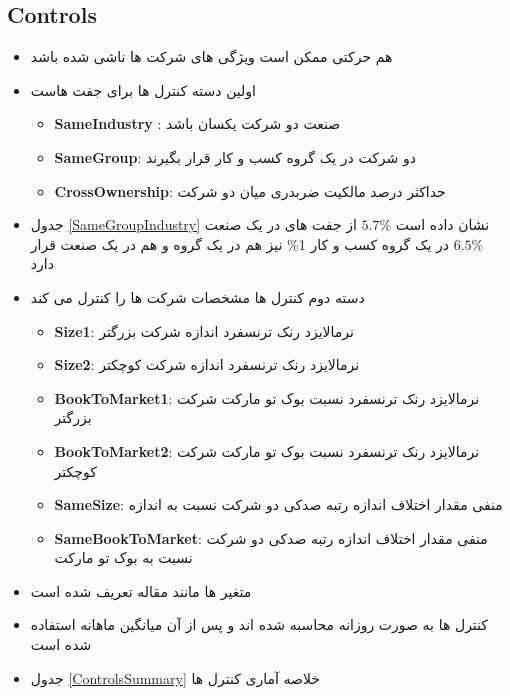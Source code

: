 \FloatBarrier


\subsection{Controls}

\begin{itemize}
	\item 
	هم حرکتی ممکن است ویژگی های شرکت ها ناشی شده باشد
	
	\item 
	اولین دسته کنترل ها برای جفت هاست
	\begin{itemize}
\item 
\textbf{SameIndustry} :
صنعت دو شرکت یکسان باشد
\item 
\textbf{SameGroup}:
دو شرکت در یک گروه کسب و کار قرار بگیرند
\item 
\textbf{CrossOwnership}:
حداکثر درصد مالکیت ضربدری میان دو شرکت
		
	\end{itemize}
	\item 
	جدول
	\ref{SameGroupIndustry}
	نشان داده است $5.7 \%$ از جفت های در یک صنعت
	$6.5 \%$ در یک گروه کسب و کار
	1\% نیز هم در یک گروه و هم در یک صنعت قرار دارد
	\item 
دسته دوم کنترل ها مشخصات شرکت ها را کنترل می کند
\begin{itemize}
	\item \textbf{Size1}:
	نرمالایزد رنک ترنسفرد اندازه شرکت بزرگتر
	
	
	\item \textbf{Size2}:
	نرمالایزد رنک ترنسفرد اندازه شرکت کوچکتر
	
	\item \textbf{BookToMarket1}:
	نرمالایزد رنک ترنسفرد نسبت بوک تو مارکت شرکت بزرگتر
	
	\item \textbf{BookToMarket2}:
		نرمالایزد رنک ترنسفرد نسبت بوک تو مارکت شرکت کوچکتر
	\item \textbf{SameSize}:
	منفی مقدار اختلاف اندازه رتبه صدکی دو شرکت نسبت به اندازه
	\item  \textbf{SameBookToMarket}:
	منفی مقدار اختلاف اندازه رتبه صدکی دو شرکت نسبت به بوک تو مارکت
\end{itemize}
	\item 
	متغیر ها مانند مقاله
	تعریف شده است
	\item
کنترل ها به صورت روزانه محاسبه شده اند و پس از آن میانگین ماهانه استفاده شده است
\item 
جدول 
\ref{ControlsSummary}
خلاصه آماری کنترل ها
\end{itemize}



